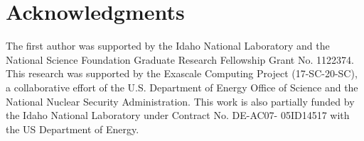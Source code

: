 \section*{A\lowercase{cknowledgments}}

The first author was supported by the Idaho National Laboratory and the National Science Foundation Graduate Research Fellowship Grant No. 1122374. This research was supported by the Exascale Computing Project (17-SC-20-SC), a collaborative effort of the U.S. Department of Energy Office of Science and the National Nuclear Security Administration. This work is also partially funded by the Idaho National Laboratory under Contract No. DE-AC07- 05ID14517 with the US Department of Energy.
